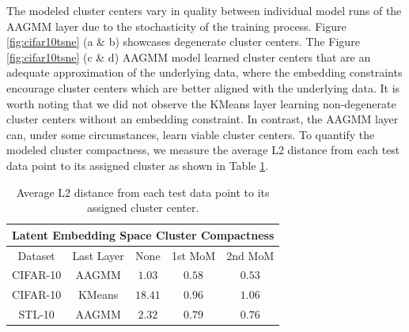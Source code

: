 \documentclass[10pt,twocolumn,letterpaper]{article}
\begin{document}

The modeled cluster centers vary in quality between individual model runs of the AAGMM layer due to the stochasticity of the training process.
Figure \ref{fig:cifar10tsne} (a \& b) showcases degenerate cluster centers.
The Figure \ref{fig:cifar10tsne} (c \& d) AAGMM model learned cluster centers that are an adequate approximation of the underlying data, where the embedding constraints encourage cluster centers which are better aligned with the underlying data.
It is worth noting that we did not observe the KMeans layer learning non-degenerate cluster centers without an embedding constraint.
In contrast, the AAGMM layer can, under some circumstances, learn viable cluster centers.
To quantify the modeled cluster compactness, we measure the average L2 distance from each test data point to its assigned cluster as shown in Table \ref{compactness}.

\begin{table}[h!]
	\begin{tabular}{c|c|c|c|c}
		
		\multicolumn{5}{c}{Latent Embedding Space Cluster Compactness} \\
		\hline\hline
		Dataset & Last Layer & None & 1st MoM & 2nd MoM \\
		\hline
		CIFAR-10 & AAGMM & $1.03$ & $0.58$ & $0.53$ \\
		CIFAR-10 & KMeans & $18.41$ & $0.96$ & $1.06$\\
		\hline
		STL-10 & AAGMM & $2.32$ & $0.79$ & $0.76$ \\
	\end{tabular}
	\caption{Average L2 distance from each test data point to its assigned cluster center.}
	\label{compactness}
\end{table}
\end{document}
